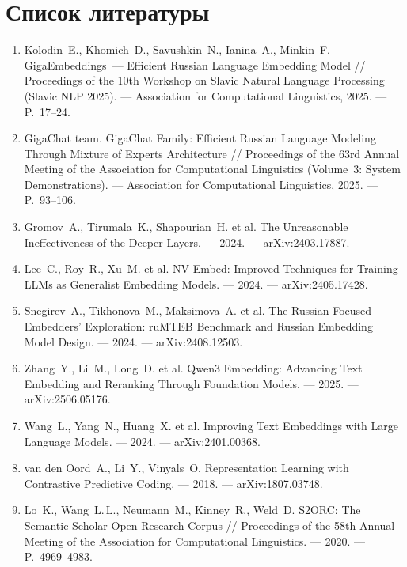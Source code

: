 \documentclass[12pt,a4paper]{article}
\begin{document}
\section*{Список литературы}
\begin{enumerate}
  \item\label{ref:acl} Kolodin~E., Khomich~D., Savushkin~N., Ianina~A., Minkin~F. GigaEmbeddings~--- Efficient Russian Language Embedding Model // Proceedings of the 10th Workshop on Slavic Natural Language Processing (Slavic NLP 2025). --- Association for Computational Linguistics, 2025. --- P.~17--24.
  \item\label{ref:gigachat} GigaChat team. GigaChat Family: Efficient Russian Language Modeling Through Mixture of Experts Architecture // Proceedings of the 63rd Annual Meeting of the Association for Computational Linguistics (Volume~3: System Demonstrations). --- Association for Computational Linguistics, 2025. --- P.~93--106.
  \item\label{ref:gromov} Gromov~A., Tirumala~K., Shapourian~H. et al. The Unreasonable Ineffectiveness of the Deeper Layers. --- 2024. --- arXiv:2403.17887.
  \item\label{ref:nvembed} Lee~C., Roy~R., Xu~M. et al. NV-Embed: Improved Techniques for Training LLMs as Generalist Embedding Models. --- 2024. --- arXiv:2405.17428.
  \item\label{ref:mteb} Snegirev~A., Tikhonova~M., Maksimova~A. et al. The Russian-Focused Embedders' Exploration: ruMTEB Benchmark and Russian Embedding Model Design. --- 2024. --- arXiv:2408.12503.
  \item\label{ref:qwen} Zhang~Y., Li~M., Long~D. et al. Qwen3 Embedding: Advancing Text Embedding and Reranking Through Foundation Models. --- 2025. --- arXiv:2506.05176.
  \item\label{ref:e5mistral} Wang~L., Yang~N., Huang~X. et al. Improving Text Embeddings with Large Language Models. --- 2024. --- arXiv:2401.00368.
  \item\label{ref:infonce} van den Oord~A., Li~Y., Vinyals~O. Representation Learning with Contrastive Predictive Coding. --- 2018. --- arXiv:1807.03748.
  \item\label{ref:s2orc} Lo~K., Wang~L.\,L., Neumann~M., Kinney~R., Weld~D. S2ORC: The Semantic Scholar Open Research Corpus // Proceedings of the 58th Annual Meeting of the Association for Computational Linguistics. --- 2020. --- P.~4969--4983.

\end{enumerate}
\end{document}
